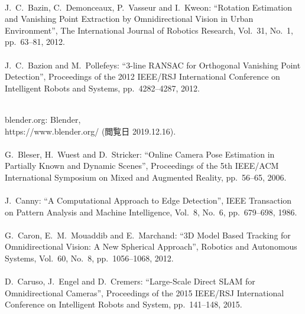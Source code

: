 \begin{mythebibliography}{}
\leavevmode \\J.~C.~Bazin, C.~Demonceaux, P.~Vasseur and I.~Kweon:
\newblock ``Rotation Estimation and Vanishing Point Extraction by Omnidirectional Vision in Urban Environment'',
\newblock The International Journal of Robotics Research, Vol.~31, No.~1, pp.~63--81, 2012.
\\

\leavevmode \\J.~C.~Bazion and M.~Pollefeys:
\newblock ``3-line RANSAC for Orthogonal Vanishing Point Detection'',
\newblock Proceedings of the 2012 IEEE/RSJ International Conference on Intelligent Robots and Systems, pp.~4282--4287, 2012.
\\

\newpage

\leavevmode \\blender.org:
\newblock Blender,\\
\newblock https://www.blender.org/ (閲覧日 2019.12.16).
\\

\leavevmode \\G.~Bleser, H.~Wuest and D.~Stricker:
\newblock ``Online Camera Pose Estimation in Partially Known and Dynamic Scenes'',
\newblock Proceedings of the 5th IEEE/ACM International Symposium on Mixed and Augmented Reality, pp.~56--65, 2006.
\\

\leavevmode \\J.~Canny:
\newblock ``A Computational Approach to Edge Detection'',
\newblock IEEE Transaction on Pattern Analysis and Machine Intelligence, Vol.~8, No.~6, pp.~679--698, 1986.
\\

\leavevmode \\G.~Caron, E.~M.~Mouaddib and E.~Marchand:
\newblock ``3D Model Based Tracking for Omnidirectional Vision: A New Spherical Approach'',
\newblock Robotics and Autonomous Systems, Vol.~60, No.~8, pp.~1056--1068, 2012.
\\

\leavevmode \\D.~Caruso, J.~Engel and D.~Cremers:
\newblock ``Large-Scale Direct SLAM for Omnidirectional Cameras'',
\newblock Proceedings of the 2015 IEEE/RSJ International Conference on Intelligent Robots and System, pp.~141--148, 2015.
\\


\end{mythebibliography}

